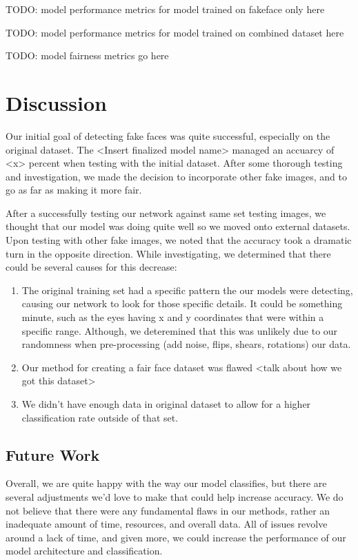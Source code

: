 \documentclass[11pt, letterpaper]{article}
\begin{document}
\begin{multicols}{2}
  TODO: model performance metrics for model trained on fakeface only here

  TODO: model performance metrics for model trained on combined dataset here

  TODO: model fairness metrics go here

  \section{Discussion}
  Our initial goal of detecting fake faces was quite successful, especially on
  the original dataset. The <Insert finalized model name> managed an accuarcy of
  <x> percent when testing with the initial dataset. After some thorough testing
  and investigation, we made the decision to incorporate other fake images, and
  to go as far as making it more fair. 
	
  After a successfully testing our network against same set testing images, we
  thought that our model was doing quite well so we moved onto external
  datasets. Upon testing with other fake images, we noted that the accuracy took
  a dramatic turn in the opposite direction. While investigating, we determined
  that there could be several causes for this decrease:
	
	\begin{enumerate}
  		\item The original training set had a specific pattern the our models were
  		detecting, causing our network to look for those specific details. It
  		could be something minute, such as the eyes having x and y coordinates
  		that were within a specific range. Although, we deteremined that this was
  		unlikely due to our randomness when pre-processing (add noise, flips,
  		shears, rotations) our data. 
  		\item Our method for creating a fair face dataset was flawed <talk about
  		how we got this dataset>
  		\item We didn't have enough data in original dataset to allow for a higher
  		classification rate outside of that set. 
	\end{enumerate}
	
  \subsection{Future Work}
  Overall, we are quite happy with the way our model classifies, but there are
  several adjustments we'd love to make that could help increase accuracy. We do
  not believe that there were any fundamental flaws in our methods, rather an
  inadequate amount of time, resources, and overall data. All of issues revolve
  around a lack of time, and given more, we could increase the performance of
  our model architecture and classification. 
  

\end{multicols}
\end{document}
